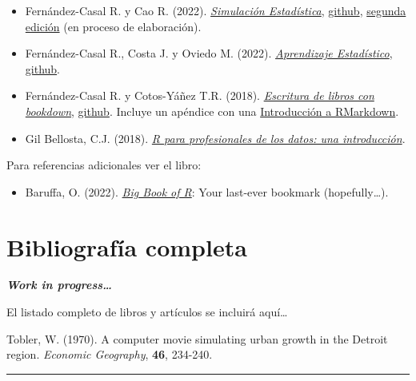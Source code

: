 \documentclass[
]{book}
\providecommand{\tightlist}{%
  \setlength{\itemsep}{0pt}\setlength{\parskip}{0pt}}
\theoremstyle{break}
\theoremstyle{definition}
\theoremstyle{definition}
\theoremstyle{definition}
\theoremstyle{definition}
\theoremstyle{remark}
\begin{document}
\begin{itemize}
\item
  Fernández-Casal R. y Cao R. (2022). \emph{\href{https://rubenfcasal.github.io/simbook}{Simulación Estadística}}, \href{https://github.com/rubenfcasal/simbook}{github}, \href{https://rubenfcasal.github.io/simbook2}{segunda edición} (en proceso de elaboración).
\item
  Fernández-Casal R., Costa J. y Oviedo M. (2022). \emph{\href{https://rubenfcasal.github.io/aprendizaje_estadistico}{Aprendizaje Estadístico}}, \href{https://github.com/rubenfcasal/aprendizaje_estadistico}{github}.
\item
  Fernández-Casal R. y Cotos-Yáñez T.R. (2018). \emph{\href{https://rubenfcasal.github.io/bookdown_intro}{Escritura de libros con bookdown}}, \href{https://github.com/rubenfcasal/bookdown_intro}{github}. Incluye un apéndice con una \href{https://rubenfcasal.github.io/bookdown_intro/rmarkdown.html}{Introducción a RMarkdown}.
\item
  Gil Bellosta, C.J. (2018). \emph{\href{https://www.datanalytics.com/libro_r}{R para profesionales de los datos: una introducción}}.
\end{itemize}

Para referencias adicionales ver el libro:

\begin{itemize}
\tightlist
\item
  Baruffa, O. (2022). \emph{\href{https://www.bigbookofr.com}{Big Book of R}}: Your last-ever bookmark (hopefully\ldots).
\end{itemize}

\section{Bibliografía completa}\label{bibliografuxeda-completa}

\textbf{\emph{Work in progress\ldots{}}}

El listado completo de libros y artículos se incluirá aquí\ldots{}

Tobler, W. (1970). A computer movie simulating urban growth in the Detroit region. \emph{Economic Geography}, \textbf{46}, 234-240.

\begin{center}\rule{0.5\linewidth}{0.5pt}\end{center}
\end{document}
